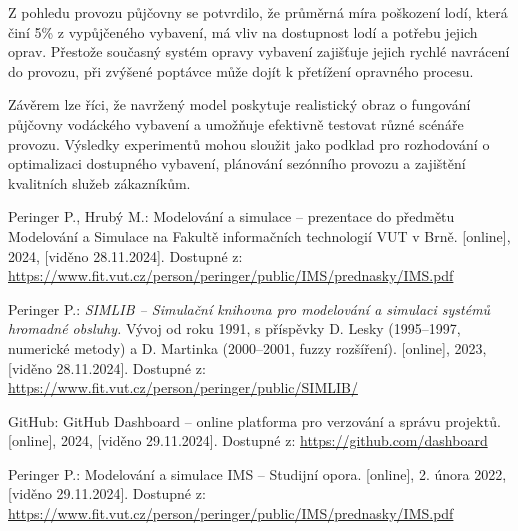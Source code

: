 \documentclass[a4paper, 12pt, hidelinks]{article}
\begin{document}
Z pohledu provozu půjčovny se potvrdilo, že průměrná míra poškození lodí, která činí 5\% z vypůjčeného vybavení, má vliv na dostupnost lodí a potřebu jejich oprav. Přestože současný systém opravy vybavení zajišťuje jejich rychlé navrácení do provozu, při zvýšené poptávce může dojít k přetížení opravného procesu.

Závěrem lze říci, že navržený model poskytuje realistický obraz o fungování půjčovny vodáckého vybavení a umožňuje efektivně testovat různé scénáře provozu. Výsledky experimentů mohou sloužit jako podklad pro rozhodování o optimalizaci dostupného vybavení, plánování sezónního provozu a zajištění kvalitních služeb zákazníkům.

\newpage


\renewcommand{\refname}{Bibliografie}
\begin{thebibliography}{9}

     Peringer P., Hrubý M.: 
    Modelování a simulace – prezentace do předmětu Modelování a Simulace na Fakultě informačních technologií VUT v Brně. [online], 2024, [viděno 28.11.2024]. Dostupné z: \url{https://www.fit.vut.cz/person/peringer/public/IMS/prednasky/IMS.pdf}

    Peringer P.: \textit{SIMLIB – Simulační knihovna pro modelování a simulaci systémů hromadné obsluhy.} Vývoj od roku 1991, s příspěvky D. Lesky (1995–1997, numerické metody) a D. Martinka (2000–2001, fuzzy rozšíření). [online], 2023, [viděno 28.11.2024]. Dostupné z: \url{https://www.fit.vut.cz/person/peringer/public/SIMLIB/}

     GitHub:
    GitHub Dashboard – online platforma pro verzování a správu projektů. [online], 2024, [viděno 29.11.2024]. Dostupné z: \url{https://github.com/dashboard}

     Peringer P.:
    Modelování a simulace IMS – Studijní opora. [online], 2. února 2022, [viděno 29.11.2024]. Dostupné z: \url{https://www.fit.vut.cz/person/peringer/public/IMS/prednasky/IMS.pdf}


\end{thebibliography}
\end{document}
